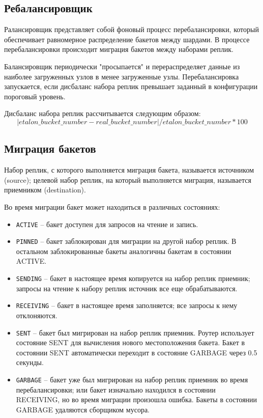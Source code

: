 \subsection{Ребалансировщик}

Ралансировщик представляет собой фоновый процесс перебалансировки, который
обеспечивает равномерное распределение бакетов между шардами. В процессе
перебалансировки происходит миграция бакетов между наборами реплик.

Балансировщик периодически "просыпается" и перераспределяет данные из наиболее
загруженных узлов в менее загруженные узлы. Перебалансировка запускается, если
дисбаланс набора реплик превышает заданный в конфигурации пороговый уровень.

Дисбаланс набора реплик рассчитывается следующим образом:
\begin{equation}
|etalon\_bucket\_number - real\_bucket\_number| / etalon\_bucket\_number * 100
\end{equation}

\subsection{Миграция бакетов}

Набор реплик, с которого выполняется миграция бакета, называется
источником (source); целевой набор реплик, на который выполняется
миграция, называется приемником (destination).

Во время миграции бакет может находиться в различных состояниях:

\begin{itemize}
\item \texttt{ACTIVE} -- бакет доступен для запросов на чтение и запись.
\item \texttt{PINNED} -- бакет заблокирован для миграции на другой набор
    реплик. В остальном заблокированные бакеты аналогичны бакетам в состоянии
        ACTIVE.
\item \texttt{SENDING} -- бакет в настоящее время копируется на набор реплик
    приемник; запросы на чтение к набору реплик источник все еще
        обрабатываются.
\item \texttt{RECEIVING} -- бакет в настоящее время заполняется; все запросы к
    нему отклоняются.
\item \texttt{SENT} -- бакет был мигрирован на набор реплик приемник. Роутер
    использует состояние SENT для вычисления нового местоположения бакета.
        Бакет в состоянии SENT автоматически переходит в состояние GARBAGE
        через 0.5 секунды.
\item \texttt{GARBAGE} -- бакет уже был мигрирован на набор реплик приемник во
    время перебалансировки; или бакет изначально находился в состоянии
        RECEIVING, но во время миграции произошла ошибка. Бакеты в состоянии
        GARBAGE удаляются сборщиком мусора.
\end{itemize}

